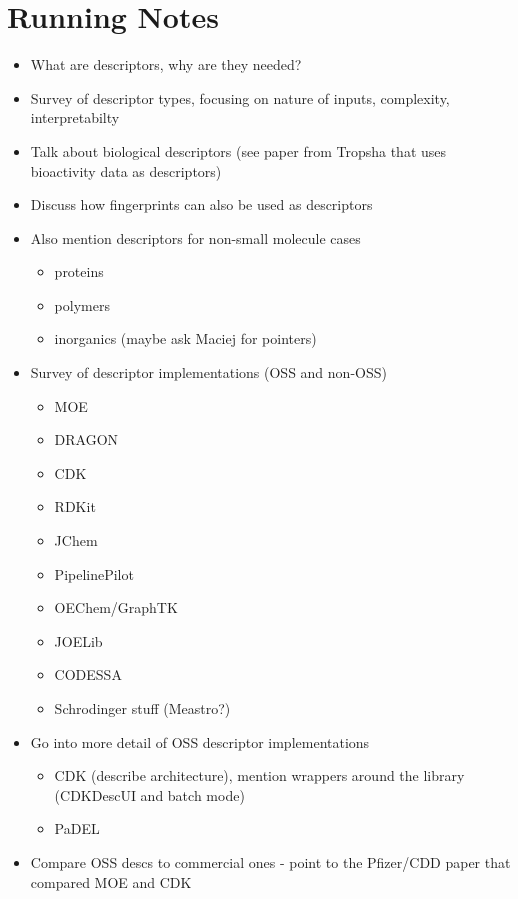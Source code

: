 \documentclass[letterpaper, 12pt]{article}
\begin{document}
\section{Running Notes}
\begin{itemize}
\item What are descriptors, why are they needed?
\item Survey of descriptor types, focusing on nature of inputs,
  complexity, interpretabilty 
\item Talk about biological descriptors (see paper from Tropsha that
  uses bioactivity data as descriptors)
\item Discuss how fingerprints can also be used as descriptors
\item Also mention descriptors for non-small molecule cases
  \begin{itemize}
  \item proteins
  \item polymers
  \item inorganics (maybe ask Maciej for pointers)
  \end{itemize}
\item Survey of descriptor implementations (OSS and non-OSS)
  \begin{itemize}
  \item MOE
  \item DRAGON
  \item CDK
  \item RDKit
  \item JChem
  \item PipelinePilot
  \item OEChem/GraphTK
  \item JOELib
  \item CODESSA
  \item Schrodinger stuff (Meastro?)
  \end{itemize}
\item Go into more detail of OSS descriptor implementations
  \begin{itemize}
  \item CDK (describe architecture), mention wrappers around the
    library (CDKDescUI and batch mode)
  \item PaDEL
  \end{itemize}
\item Compare OSS descs to commercial ones - point to the Pfizer/CDD
  paper that compared MOE and CDK
\end{itemize}
\clearpage
\newpage



\newpage
\end{document}
